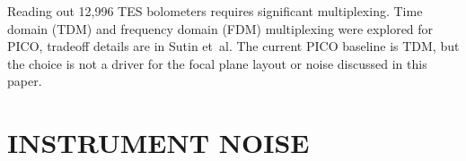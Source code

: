 \documentclass[]{spie}  %
\newcommand{\comr}[1]{\textcolor{red}{#1}}
\begin{document}
Reading out 12,996 TES bolometers requires significant multiplexing.  Time domain (TDM) and frequency domain (FDM) 
multiplexing were explored for PICO, tradeoff details are in Sutin et~al.\cite{brian_spie}  %
The current PICO baseline is TDM, 
but the choice is not a driver for the focal plane layout or noise discussed in this paper.









\section{INSTRUMENT NOISE}
\label{sec:noise}
\end{document}
